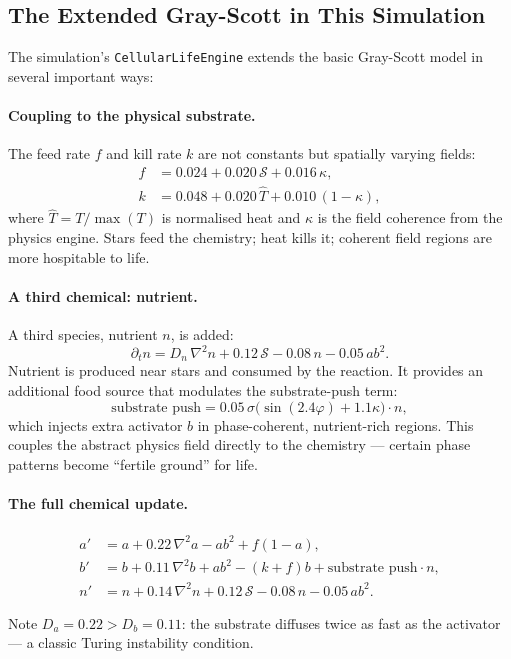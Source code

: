 \documentclass[12pt,a4paper]{article}
\begin{document}
\subsection{The Extended Gray-Scott in This Simulation}

The simulation's \texttt{CellularLifeEngine} extends the basic
Gray-Scott model in several important ways:

\paragraph{Coupling to the physical substrate.}
The feed rate $f$ and kill rate $k$ are not constants but spatially varying fields:
\begin{align}
  f &= 0.024 + 0.020\,\mathcal{S} + 0.016\,\kappa, \\
  k &= 0.048 + 0.020\,\hat{T} + 0.010\,(1-\kappa),
\end{align}
where $\hat{T} = T/\max(T)$ is normalised heat
and $\kappa$ is the field coherence from the physics engine.
Stars feed the chemistry; heat kills it; coherent field regions
are more hospitable to life.

\paragraph{A third chemical: nutrient.}
A third species, nutrient $n$, is added:
\begin{equation}
  \partial_t n = D_n\,\nabla^2 n + 0.12\,\mathcal{S}
    - 0.08\,n - 0.05\,ab^2.
\end{equation}
Nutrient is produced near stars and consumed by the reaction.
It provides an additional food source that modulates the
substrate-push term:
\begin{equation}
  \text{substrate push} = 0.05\,\sigma\!\bigl(\sin(2.4\varphi) + 1.1\kappa\bigr)\cdot n,
\end{equation}
which injects extra activator $b$ in phase-coherent, nutrient-rich regions.
This couples the abstract physics field directly to the chemistry —
certain phase patterns become ``fertile ground'' for life.

\paragraph{The full chemical update.}
\begin{tcolorbox}[mathbox={Extended Gray-Scott equations}]
\begin{align}
  a' &= a + 0.22\,\nabla^2 a - ab^2 + f(1-a), \\
  b' &= b + 0.11\,\nabla^2 b + ab^2 - (k+f)b + \text{substrate push}\cdot n, \\
  n' &= n + 0.14\,\nabla^2 n + 0.12\,\mathcal{S}
       - 0.08\,n - 0.05\,ab^2.
\end{align}
\end{tcolorbox}
Note $D_a = 0.22 > D_b = 0.11$:
the substrate diffuses twice as fast as the activator —
a classic Turing instability condition.
\end{document}
